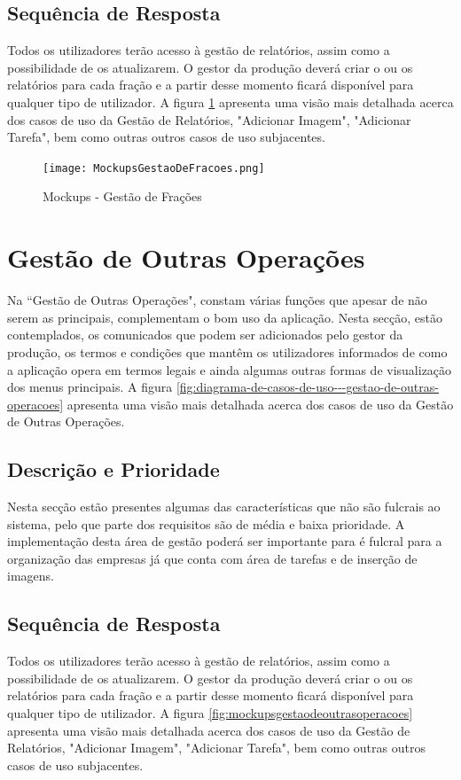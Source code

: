 \documentclass{scrreprt}
\begin{document}
	\subsection{Sequência de Resposta}
	Todos os utilizadores terão acesso à gestão de relatórios, assim como a possibilidade de os atualizarem. O gestor da produção deverá criar o ou os relatórios para cada fração e a partir desse momento ficará disponível para qualquer tipo de utilizador. A figura \ref{fig:mockupsgestaodefracoes}  apresenta uma visão mais detalhada acerca dos casos de uso da Gestão de Relatórios, "Adicionar Imagem", "Adicionar Tarefa", bem como outras outros casos de uso subjacentes.
	
	\begin{figure}[!h]
		\centering
		\texttt{[image: MockupsGestaoDeFracoes.png]}
		\caption{Mockups - Gestão de Frações}
		\label{fig:mockupsgestaodefracoes}
	\end{figure}
	
	\section{Gestão de Outras Operações}
	Na “Gestão de Outras Operações", constam várias funções que apesar de não serem as principais, complementam o bom uso da aplicação. Nesta secção, estão contemplados, os comunicados que podem ser adicionados pelo gestor da produção, os termos e condições que mantêm os utilizadores informados de como a aplicação opera em termos legais e ainda algumas outras formas de visualização dos menus principais. A figura \ref{fig:diagrama-de-casos-de-uso---gestao-de-outras-operacoes} apresenta uma visão mais detalhada acerca dos casos de uso da Gestão de Outras Operações.
	
	\subsection{Descrição e Prioridade}
	Nesta secção estão presentes algumas das características que não são fulcrais ao sistema, pelo que parte dos requisitos são de média e baixa prioridade. A implementação desta área de gestão poderá ser importante para é fulcral para a organização das empresas já que conta com área de tarefas e de inserção de imagens.
	
	\subsection{Sequência de Resposta}
	Todos os utilizadores terão acesso à gestão de relatórios, assim como a possibilidade de os atualizarem. O gestor da produção deverá criar o ou os relatórios para cada fração e a partir desse momento ficará disponível para qualquer tipo de utilizador. A figura \ref{fig:mockupsgestaodeoutrasoperacoes}  apresenta uma visão mais detalhada acerca dos casos de uso da Gestão de Relatórios, "Adicionar Imagem", "Adicionar Tarefa", bem como outras outros casos de uso subjacentes.
	
\end{document}
